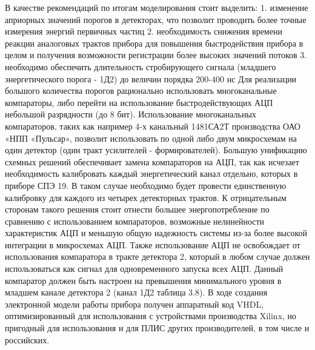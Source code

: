 В качестве рекомендаций по итогам моделирования стоит выделить:
1.	изменение априорных значений порогов в детекторах, что позволит проводить более точные измерения энергий первичных частиц 
2.	необходимость снижения времени реакции аналоговых трактов прибора для повышения быстродействия прибора в целом и получения возможности регистрации более высоких значений потоков
3.	необходимо обеспечить длительность стробирующего сигнала (младшего энергетического порога - 1Д2) до величин порядка 200-400 нс
Для реализации большого количества порогов рационально использовать многоканальные компараторы, либо перейти на использование быстродействующих АЦП небольшой разрядности (до 8 бит). Использование многоканальных компараторов, таких как например 4-х канальный 1481СА2Т производства ОАО «НПП «Пульсар», позволит использовать по одной либо двум микросхемам на один детектор (один тракт усилителей - формирователей). Большую унификацию схемных решений обеспечивает замена компараторов на АЦП, так как исчезает необходимость калибровать каждый энергетический канал отдельно, которых в приборе СПЭ 19. В таком случае необходимо будет провести единственную калибровку для каждого из четырех детекторных трактов. К отрицательным сторонам такого решения стоит отнести большее энергопотребление по сравнению с использованием компараторов, возможные нелинейности характеристик АЦП и меньшую общую надежность системы из-за более высокой интеграции в микросхемах АЦП. Также использование АЦП не освобождает от использования компаратора в тракте детектора 2, который в любом случае должен использоваться как сигнал для одновременного запуска всех АЦП. Данный компаратор должен быть настроен на превышения минимального уровня в младшем канале детектора 2 (канал 1Д2 таблица 3.8).
В ходе создания электронной модели работы прибора получен аппаратный код VHDL, оптимизированный для использования с устройствами производства Xilinx, но пригодный для использования и для ПЛИС других производителей, в том числе и российских.

